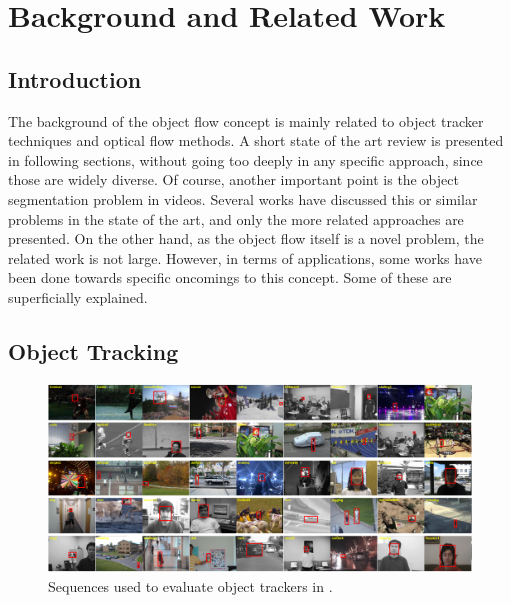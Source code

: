 \chapter{Background and Related Work} \label{chap:background}

\section{Introduction}

The background of the object flow concept is mainly related to object tracker techniques and optical flow methods. A short state of the art review is presented in 
following sections, without going too deeply in any specific approach, since those are widely diverse. Of course, another important point is the object segmentation problem in videos. Several works have discussed this or similar problems in 
the state of the art, and only the more related approaches are presented. On the other hand, as the object flow itself is a novel problem, the related work is not large.
 However, in terms of applications, some works have been done towards specific oncomings to this concept. Some of these are superficially explained.

\section{Object Tracking}

   \begin{figure}[thpb]
      \centering
      \includegraphics[width=1.0\textwidth]{../images/tr_db.png}
      \caption{Sequences used to evaluate object trackers in \cite{c16}. }
      \label{tr_db}
   \end{figure}

